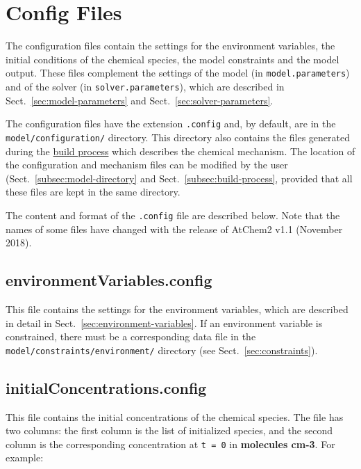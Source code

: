 \section{Config Files} \label{sec:config-files}

The configuration files contain the settings for the environment
variables, the initial conditions of the chemical species, the model
constraints and the model output. These files complement the settings
of the model (in \texttt{model.parameters}) and of the solver (in
\texttt{solver.parameters}), which are described in
Sect.~\ref{sec:model-parameters} and Sect.~\ref{sec:solver-parameters}.

The configuration files have the extension \texttt{.config} and, by
default, are in the \texttt{model/configuration/} directory. This
directory also contains the files generated during the
\hyperref[subsec:build-process]{build process} which describes the
chemical mechanism. The location of the configuration and mechanism
files can be modified by the user (Sect.~\ref{subsec:model-directory}
and Sect.~\ref{subsec:build-process}, provided that all these files
are kept in the same directory.

The content and format of the \texttt{.config} file are described
below. Note that the names of some files have changed with the release
of AtChem2 v1.1 (November 2018).

\subsection{environmentVariables.config} \label{subsec:environmentvariables}

This file contains the settings for the environment variables, which
are described in detail in Sect.~\ref{sec:environment-variables}. If
an environment variable is constrained, there must be a corresponding
data file in the \texttt{model/constraints/environment/} directory
(see Sect.~\ref{sec:constraints}).

\subsection{initialConcentrations.config} \label{subsec:initialconcentrations}

This file contains the initial concentrations of the chemical species.
The file has two columns: the first column is the list of initialized
species, and the second column is the corresponding concentration at
\texttt{t\ =\ 0} in \textbf{molecules cm-3}. For example:

